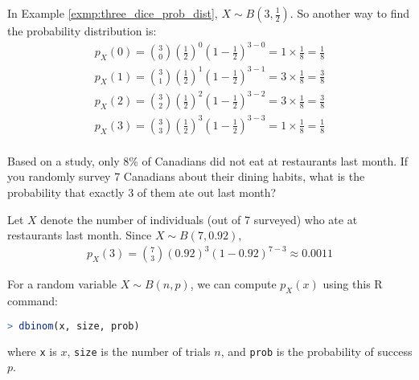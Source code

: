 \begin{exmp}
    In Example \autoref{exmp:three_dice_prob_dist}, \( X \sim B(3, \frac{1}{2}) \).
    So another way to find the probability distribution is:
    \begin{gather*}
        p_{X}(0) = \binom{3}{0} (\frac{1}{2})^0 (1 - \frac{1}{2})^{3 - 0} = 1 \times \frac{1}{8} = \frac{1}{8}\\
        p_{X}(1) = \binom{3}{1} (\frac{1}{2})^1 (1 - \frac{1}{2})^{3 - 1} = 3 \times \frac{1}{8} = \frac{3}{8}\\
        p_{X}(2) = \binom{3}{2} (\frac{1}{2})^2 (1 - \frac{1}{2})^{3 - 2} = 3 \times \frac{1}{8} = \frac{3}{8}\\
        p_{X}(3) = \binom{3}{3} (\frac{1}{2})^3 (1 - \frac{1}{2})^{3 - 3} = 1 \times \frac{1}{8} = \frac{1}{8}\\
    \end{gather*}
\end{exmp}
\begin{exmp}
    Based on a study, only 8\% of Canadians did not eat at restaurants last month.
    If you randomly survey 7 Canadians about their dining habits,
    what is the probability that exactly 3 of them ate out last month?
\end{exmp}
\begin{solution}
    Let \( X \) denote the number of individuals (out of 7 surveyed) who ate at restaurants last month.
    Since \( X \sim B(7, 0.92) \),
    \begin{gather*}
        p_{X}(3) = \binom{7}{3} (0.92)^3 (1 - 0.92)^{7 - 3} \approx 0.0011
    \end{gather*}
\end{solution}
For a random variable \( X \sim B(n, p) \), we can compute \( p_{X}(x) \) using this R command:
\begin{lstlisting}[language=R]
> dbinom(x, size, prob)
\end{lstlisting}
where \verb|x| is \( x \), \verb|size| is the number of trials \( n \), and \verb|prob| is the probability of success \( p \).


